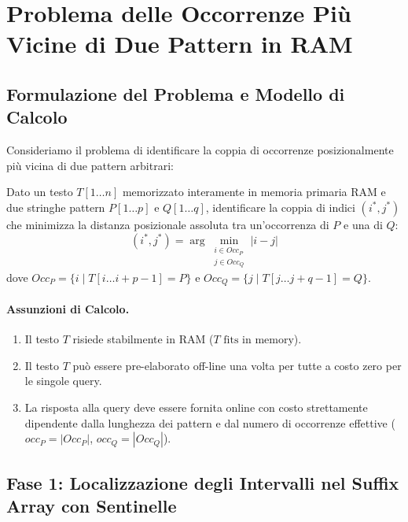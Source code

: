 \FloatBarrier
\section{Problema delle Occorrenze Pi\`u Vicine di Due Pattern in RAM}
\label{sec:closest-occurrences-patterns}

\FloatBarrier
\subsection{Formulazione del Problema e Modello di Calcolo}
\label{subsec:formulazione-closest-occurrences}

Consideriamo il problema di identificare la coppia di occorrenze posizionalmente pi\`u vicina di due pattern arbitrari:
\begin{definition}
Dato un testo $T[1 \dots n]$ memorizzato interamente in memoria primaria RAM e due stringhe pattern $P[1 \dots p]$ e $Q[1 \dots q]$, identificare la coppia di indici $(i^*, j^*)$ che minimizza la distanza posizionale assoluta tra un'occorrenza di $P$ e una di $Q$:
\begin{equation}
  (i^*, j^*) = \arg\min_{\substack{i \in Occ_P \\ j \in Occ_Q}} |i - j|
\end{equation}
dove $Occ_P = \{ i \mid T[i \dots i + p - 1] = P \}$ e $Occ_Q = \{ j \mid T[j \dots j + q - 1] = Q \}$.
\end{definition}

\paragraph{Assunzioni di Calcolo.}
\begin{enumerate}
  \item Il testo $T$ risiede stabilmente in RAM ($T \text{ fits in memory}$).
  \item Il testo $T$ pu\`o essere pre-elaborato off-line una volta per tutte a costo zero per le singole query.
  \item La risposta alla query deve essere fornita online con costo strettamente dipendente dalla lunghezza dei pattern e dal numero di occorrenze effettive ($occ_P = |Occ_P|$, $occ_Q = |Occ_Q|$).
\end{enumerate}

\FloatBarrier
\subsection{Fase 1: Localizzazione degli Intervalli nel Suffix Array con Sentinelle}
\label{subsec:fase1-ricerca-intervalli-sa}


